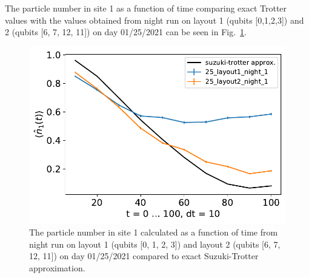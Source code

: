 The particle number in site 1 as a function of time comparing exact Trotter values with the values obtained from night run on layout 1 (qubits [0,1,2,3]) and 2 (qubits [6, 7, 12, 11]) on day 01/25/2021 can be seen in Fig.~\ref{fig:n1_Story5}.

\begin{figure}[htpb]
    \includegraphics[scale=0.55]{TIM_[25]_[layout1, layout2]_[night]_n1.pdf}
    \caption{The particle number in site 1 calculated as a function of time from night run on layout 1 (qubits [0, 1, 2, 3]) and layout 2 (qubits [6, 7, 12, 11]) on day 01/25/2021 compared to exact Suzuki-Trotter approximation.}
    \label{fig:n1_Story5}
\end{figure}

